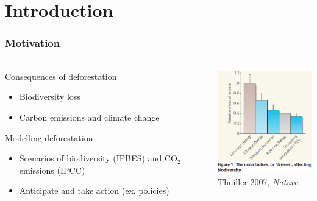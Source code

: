 \documentclass[slidetop,10pt,dvipsnames,leqno,fleqn]{beamer} %
\newif\ifplacelogo %
\begin{document}


\section{Introduction}

\begin{frame}
  \frametitle{Motivation}
  \framesubtitle{}
  \begin{columns}[c]
    \begin{column}{0.5\textwidth}
      \begin{block}{Consequences of deforestation}
        \begin{itemize}
        \item Biodiversity loss
        \item Carbon emissions and climate change
        \end{itemize}
      \end{block}
      \begin{block}{Modelling deforestation}
        \begin{itemize}
        \item Scenarios of biodiversity (IPBES) and CO$_2$ emissions (IPCC)
        \item Anticipate and take action (ex. policies)
        \end{itemize}
      \end{block}
    \end{column}
    \begin{column}{0.5\textwidth}
      \centering \includegraphics[width=5cm]{./Figures/Thuiller2007-Nature.png}\\
      {\small Thuiller 2007, \textit{Nature}}
    \end{column}
  \end{columns}
\end{frame}
\end{document}

